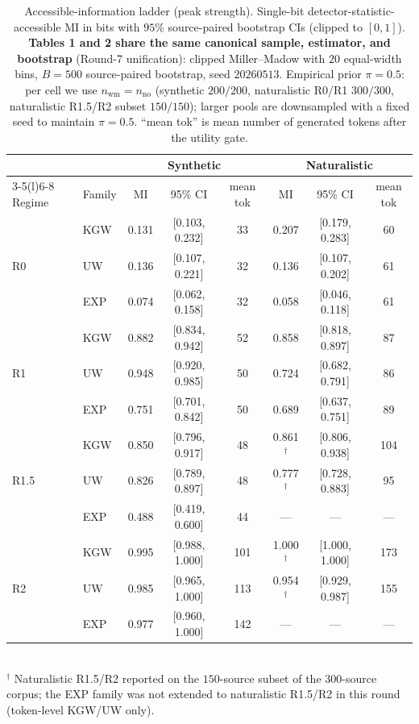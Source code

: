 \begin{table}[t]
\centering
\small
\caption{Accessible-information ladder (peak strength). Single-bit
detector-statistic-accessible MI in bits with $95\%$ source-paired
bootstrap CIs (clipped to $[0,1]$).
\textbf{Tables 1 and 2 share the same canonical sample, estimator, and bootstrap}
(Round-7 unification): clipped Miller--Madow with $20$ equal-width bins,
$B{=}500$ source-paired bootstrap, seed $20260513$. Empirical prior
$\pi{=}0.5$: per cell we use $n_{\text{wm}}{=}n_{\text{no}}$ (synthetic
$200/200$, naturalistic R0/R1 $300/300$, naturalistic R1.5/R2 subset
$150/150$); larger pools are downsampled with a fixed seed to maintain
$\pi{=}0.5$. ``mean tok'' is mean number of generated tokens after the
utility gate.}
\label{tab:main_results}
\begin{tabular}{l l c c c c c c}
\toprule
& & \multicolumn{3}{c}{Synthetic} & \multicolumn{3}{c}{Naturalistic} \\
\cmidrule(r){3-5}\cmidrule(l){6-8}
Regime & Family & MI & 95\% CI & mean tok & MI & 95\% CI & mean tok \\
\midrule
\multirow{3}{*}{R0} & KGW & 0.131 & [0.103, 0.232] & 33 & 0.207 & [0.179, 0.283] & 60 \\
                    & UW  & 0.136 & [0.107, 0.221] & 32 & 0.136 & [0.107, 0.202] & 61 \\
                    & EXP & 0.074 & [0.062, 0.158] & 32 & 0.058 & [0.046, 0.118] & 61 \\
\midrule
\multirow{3}{*}{R1} & KGW & 0.882 & [0.834, 0.942] & 52 & 0.858 & [0.818, 0.897] & 87 \\
                    & UW  & 0.948 & [0.920, 0.985] & 50 & 0.724 & [0.682, 0.791] & 86 \\
                    & EXP & 0.751 & [0.701, 0.842] & 50 & 0.689 & [0.637, 0.751] & 89 \\
\midrule
\multirow{3}{*}{R1.5} & KGW & 0.850 & [0.796, 0.917] & 48 & 0.861$^\dagger$ & [0.806, 0.938] & 104 \\
                      & UW  & 0.826 & [0.789, 0.897] & 48 & 0.777$^\dagger$ & [0.728, 0.883] & 95 \\
                      & EXP & 0.488 & [0.419, 0.600] & 44 & --- & --- & --- \\
\midrule
\multirow{3}{*}{R2}   & KGW & 0.995 & [0.988, 1.000] & 101 & 1.000$^\dagger$ & [1.000, 1.000] & 173 \\
                      & UW  & 0.985 & [0.965, 1.000] & 113 & 0.954$^\dagger$ & [0.929, 0.987] & 155 \\
                      & EXP & 0.977 & [0.960, 1.000] & 142 & --- & --- & --- \\
\bottomrule
\end{tabular}
\\[2pt]
{\footnotesize $^\dagger$ Naturalistic R1.5/R2 reported on the $150$-source
subset of the $300$-source corpus; the EXP family was not extended to
naturalistic R1.5/R2 in this round (token-level KGW/UW only).}
\end{table}
